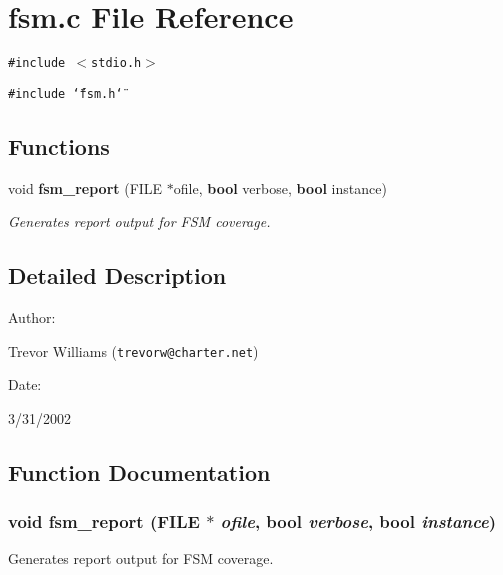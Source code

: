 \section{fsm.c File Reference}
\label{fsm_8c}
{\tt \#include $<$stdio.h$>$}\par
{\tt \#include \char`\"{}fsm.h\char`\"{}}\par
\subsection*{Functions}
\begin{CompactItemize}
\item 
void {\bf fsm\_\-report} (FILE $\ast$ofile, {\bf bool} verbose, {\bf bool} instance)
\begin{CompactList}\small\item\em Generates report output for FSM coverage.\item\end{CompactList}\end{CompactItemize}


\subsection{Detailed Description}


\begin{Desc}
\item[Author: ]\par
Trevor Williams ({\tt trevorw@charter.net}) \end{Desc}
\begin{Desc}
\item[Date: ]\par
3/31/2002\end{Desc}


\subsection{Function Documentation}
\subsubsection{\setlength{\rightskip}{0pt plus 5cm}void fsm\_\-report (FILE $\ast$ {\em ofile}, {\bf bool} {\em verbose}, {\bf bool} {\em instance})}\label{fsm_8c_a0}


Generates report output for FSM coverage.

